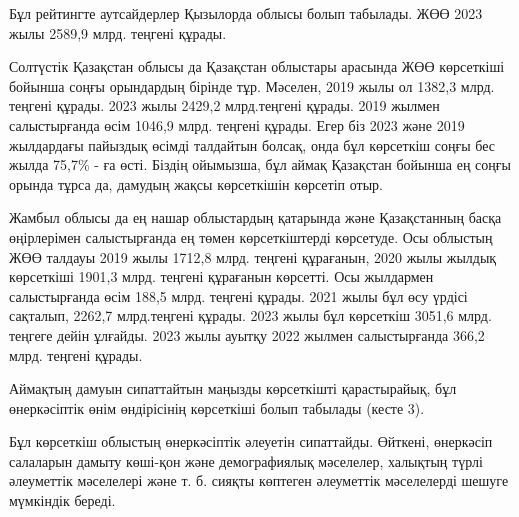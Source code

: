 \begin{multicols}{2}
Бұл рейтингте аутсайдерлер Қызылорда облысы болып табылады. ЖӨӨ 2023
жылы 2589,9 млрд. теңгені құрады.

Солтүстік Қазақстан облысы да Қазақстан облыстары арасында ЖӨӨ
көрсеткіші бойынша соңғы орындардың бірінде тұр. Мәселен, 2019 жылы ол
1382,3 млрд. теңгені құрады. 2023 жылы 2429,2 млрд.теңгені құрады. 2019
жылмен салыстырғанда өсім 1046,9 млрд. теңгені құрады. Егер біз 2023
және 2019 жылдардағы пайыздық өсімді талдайтын болсақ, онда бұл
көрсеткіш соңғы бес жылда 75,7\% - ға өсті. Біздің ойымызша, бұл аймақ
Қазақстан бойынша ең соңғы орында тұрса да, дамудың жақсы көрсеткішін
көрсетіп отыр.

Жамбыл облысы да ең нашар облыстардың қатарында және Қазақстанның басқа
өңірлерімен салыстырғанда ең төмен көрсеткіштерді көрсетуде. Осы
облыстың ЖӨӨ талдауы 2019 жылы 1712,8 млрд. теңгені құрағанын, 2020 жылы
жылдық көрсеткіші 1901,3 млрд. теңгені құрағанын көрсетті. Осы жылдармен
салыстырғанда өсім 188,5 млрд. теңгені құрады. 2021 жылы бұл өсу үрдісі
сақталып, 2262,7 млрд.теңгені құрады. 2023 жылы бұл көрсеткіш 3051,6
млрд. теңгеге дейін ұлғайды. 2023 жылы ауытқу 2022 жылмен салыстырғанда
366,2 млрд. теңгені құрады.

Аймақтың дамуын сипаттайтын маңызды көрсеткішті қарастырайық, бұл
өнеркәсіптік өнім өндірісінің көрсеткіші болып табылады (кесте 3).

Бұл көрсеткіш облыстың өнеркәсіптік әлеуетін сипаттайды. Өйткені,
өнеркәсіп салаларын дамыту көші-қон және демографиялық мәселелер,
халықтың түрлі әлеуметтік мәселелері және т. б. сияқты көптеген
әлеуметтік мәселелерді шешуге мүмкіндік береді.

\end{multicols}

